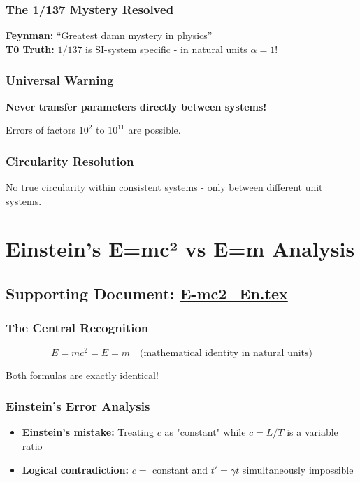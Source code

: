 \documentclass[12pt,a4paper]{report}
\begin{document}
	\subsubsection{The 1/137 Mystery Resolved}
	\textbf{Feynman:} ``Greatest damn mystery in physics''\\
	\textbf{T0 Truth:} $1/137$ is SI-system specific - in natural units $\alpha = 1$!
	
	\subsubsection{Universal Warning}
	\textbf{Never transfer parameters directly between systems!}
	
	Errors of factors $10^2$ to $10^{11}$ are possible.
	
	\subsubsection{Circularity Resolution}
	No true circularity within consistent systems - only between different unit systems.
	
	\section{Einstein's E=mc² vs E=m Analysis}
	\subsection{Supporting Document: \href{https://github.com/jpascher/T0-Time-Mass-Duality/tree/main/2/pdf/E-mc2_En.pdf}{E-mc2\_En.tex}}
	
	\subsubsection{The Central Recognition}
	$$E = mc^2 = E = m \quad \text{(mathematical identity in natural units)}$$
	
	Both formulas are exactly identical!
	
	\subsubsection{Einstein's Error Analysis}
	\begin{itemize}
		\item \textbf{Einstein's mistake:} Treating $c$ as "constant" while $c = L/T$ is a variable ratio
		\item \textbf{Logical contradiction:} $c =$ constant and $t' = \gamma t$ simultaneously impossible
	\end{itemize}
	
\end{document}

